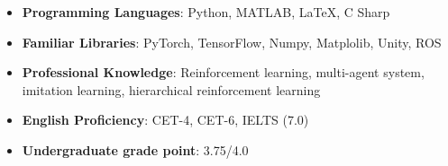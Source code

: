 \begin{itemize}[leftmargin=*]
  \item \textbf{Programming Languages}: Python, MATLAB, \LaTeX, C Sharp
  \item \textbf{Familiar Libraries}: PyTorch, TensorFlow, Numpy, Matplolib, Unity, ROS
  \item \textbf{Professional Knowledge}: Reinforcement learning, multi-agent system, imitation learning, hierarchical reinforcement learning
  \item \textbf{English Proficiency}: CET-4, CET-6, IELTS (7.0)
  \item \textbf{Undergraduate grade point}: 3.75/4.0
\end{itemize}